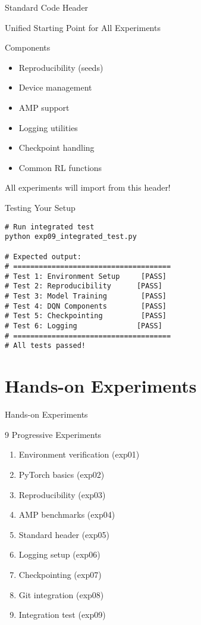 \documentclass[aspectratio=169,10pt]{beamer}
\begin{document}
\begin{frame}{Standard Code Header}
\begin{center}
\Large{Unified Starting Point for All Experiments}
\end{center}

\begin{block}{Components}
\begin{itemize}
    \item Reproducibility (seeds)
    \item Device management
    \item AMP support
    \item Logging utilities
    \item Checkpoint handling
    \item Common RL functions
\end{itemize}
\end{block}

All experiments will import from this header!
\end{frame}

\begin{frame}[fragile]{Testing Your Setup}
\begin{lstlisting}
# Run integrated test
python exp09_integrated_test.py

# Expected output:
# =====================================
# Test 1: Environment Setup     [PASS]
# Test 2: Reproducibility      [PASS]
# Test 3: Model Training        [PASS]
# Test 4: DQN Components        [PASS]
# Test 5: Checkpointing         [PASS]
# Test 6: Logging              [PASS]
# =====================================
# All tests passed!
\end{lstlisting}
\end{frame}

\section{Hands-on Experiments}

\begin{frame}{Hands-on Experiments}
\begin{center}
\Large{9 Progressive Experiments}
\end{center}

\begin{enumerate}
    \item Environment verification (exp01)
    \item PyTorch basics (exp02)
    \item Reproducibility (exp03)
    \item AMP benchmarks (exp04)
    \item Standard header (exp05)
    \item Logging setup (exp06)
    \item Checkpointing (exp07)
    \item Git integration (exp08)
    \item Integration test (exp09)
\end{enumerate}
\end{frame}
\end{document}

